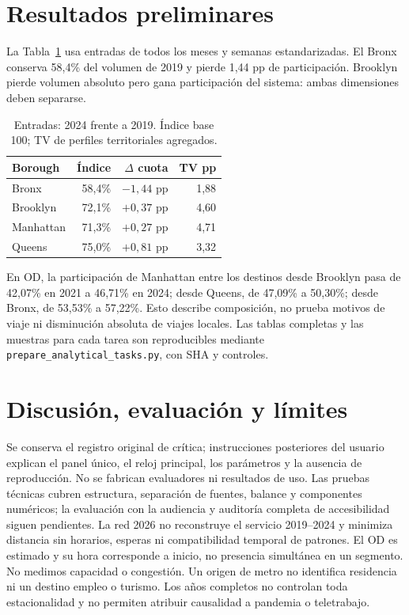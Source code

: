 \documentclass[10pt,twocolumn]{article}
\begin{document}
\section{Resultados preliminares}
La Tabla~\ref{tab:territory} usa entradas de todos los meses y semanas estandarizadas. El Bronx conserva 58,4\% del volumen de 2019 y pierde 1,44 pp de participación. Brooklyn pierde volumen absoluto pero gana participación del sistema: ambas dimensiones deben separarse.
\begin{table}[h]\centering\small
\begin{tabular}{lrrr}\toprule
Borough & Índice & $\Delta$ cuota & TV pp\\\midrule
Bronx & 58,4\% & $-1,44$ pp & 1,88\\
Brooklyn & 72,1\% & $+0,37$ pp & 4,60\\
Manhattan & 71,3\% & $+0,27$ pp & 4,71\\
Queens & 75,0\% & $+0,81$ pp & 3,32\\\bottomrule
\end{tabular}\caption{Entradas: 2024 frente a 2019. Índice base 100; TV de perfiles territoriales agregados.}\label{tab:territory}
\end{table}
En OD, la participación de Manhattan entre los destinos desde Brooklyn pasa de 42,07\% en 2021 a 46,71\% en 2024; desde Queens, de 47,09\% a 50,30\%; desde Bronx, de 53,53\% a 57,22\%. Esto describe composición, no prueba motivos de viaje ni disminución absoluta de viajes locales. Las tablas completas y las muestras para cada tarea son reproducibles mediante \texttt{prepare\_analytical\_tasks.py}, con SHA y controles.
\section{Discusión, evaluación y límites}
Se conserva el registro original de crítica; instrucciones posteriores del usuario explican el panel único, el reloj principal, los parámetros y la ausencia de reproducción. No se fabrican evaluadores ni resultados de uso. Las pruebas técnicas cubren estructura, separación de fuentes, balance y componentes numéricos; la evaluación con la audiencia y auditoría completa de accesibilidad siguen pendientes.
La red 2026 no reconstruye el servicio 2019--2024 y minimiza distancia sin horarios, esperas ni compatibilidad temporal de patrones. El OD es estimado y su hora corresponde a inicio, no presencia simultánea en un segmento. No medimos capacidad o congestión. Un origen de metro no identifica residencia ni un destino empleo o turismo. Los años completos no controlan toda estacionalidad y no permiten atribuir causalidad a pandemia o teletrabajo.
\end{document}
